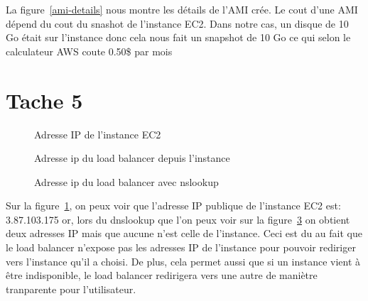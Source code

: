 \documentclass[french,a4paper,11pt]{article}
\begin{document}
    La figure~\ref{ami-details} nous montre les détails de l'AMI crée.
    Le cout d'une AMI dépend du cout du snashot de l'instance EC2.
    Dans notre cas, un disque de 10 Go était sur l'instance donc cela nous fait un snapshot de 10 Go ce qui selon le calculateur AWS coute 0.50\$ par mois

    \section{Tache 5}\label{sec:task-5}

    \begin{figure}
        \caption{\label{ec2-ip}Adresse IP de l'instance EC2}
    \end{figure}

    \begin{figure}
        \caption{\label{lb-ip}Adresse ip du load balancer depuis l'instance}
    \end{figure}

    \begin{figure}
        \caption{\label{dns-ip}Adresse ip du load balancer avec nslookup}
    \end{figure}

    Sur la figure~\ref{ec2-ip}, on peux voir que l'adresse IP publique de l'instance EC2 est: 3.87.103.175 or, lors du
    dnslookup que l'on peux voir sur la figure~\ref{dns-ip} on obtient deux adresses IP mais que aucune n'est celle de l'instance.
    Ceci est du au fait que le load balancer n'expose pas les adresses IP de l'instance pour pouvoir rediriger vers l'instance qu'il a choisi.
    De plus, cela permet aussi que si un instance vient à être indisponible, le load balancer redirigera vers une autre de maniètre tranparente pour l'utilisateur.
\end{document}

